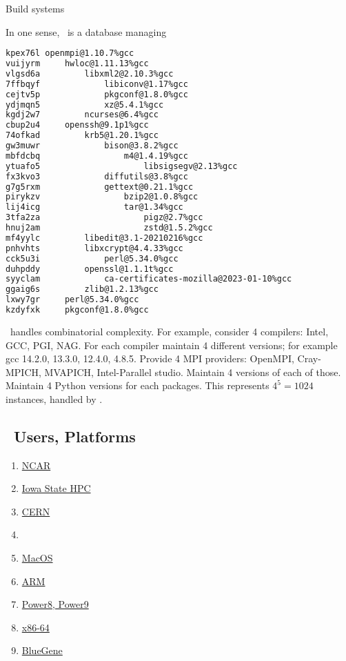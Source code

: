 \documentclass[10pt, oneside]{article}   	%
\begin{document}
Build systems

In one sense, \spack \ is a database managing 
\small{
\begin{lstlisting}[language=bash]
kpex76l openmpi@1.10.7%gcc
vuijyrm     hwloc@1.11.13%gcc
vlgsd6a         libxml2@2.10.3%gcc
7ffbqyf             libiconv@1.17%gcc
cejtv5p             pkgconf@1.8.0%gcc
ydjmqn5             xz@5.4.1%gcc
kgdj2w7         ncurses@6.4%gcc
cbup2u4     openssh@9.1p1%gcc
74ofkad         krb5@1.20.1%gcc
gw3muwr             bison@3.8.2%gcc
mbfdcbq                 m4@1.4.19%gcc
ytuafo5                     libsigsegv@2.13%gcc
fx3kvo3             diffutils@3.8%gcc
g7g5rxm             gettext@0.21.1%gcc
pirykzv                 bzip2@1.0.8%gcc
lij4icg                 tar@1.34%gcc
3tfa2za                     pigz@2.7%gcc
hnuj2am                     zstd@1.5.2%gcc
mf4yylc         libedit@3.1-20210216%gcc
pnhvhts         libxcrypt@4.4.33%gcc
cck5u3i             perl@5.34.0%gcc
duhpddy         openssl@1.1.1t%gcc
syyclam             ca-certificates-mozilla@2023-01-10%gcc
ggaig6s         zlib@1.2.13%gcc
lxwy7gr     perl@5.34.0%gcc
kzdyfxk     pkgconf@1.8.0%gcc
\end{lstlisting}
}

\spack \ handles combinatorial complexity. For example, consider 4 compilers: Intel, GCC, PGI, NAG. For each compiler maintain 4 different versions; for example gcc 14.2.0, 13.3.0, 12.4.0, 4.8.5. Provide 4 MPI providers: OpenMPI, Cray-MPICH, MVAPICH, Intel-Parallel studio. Maintain 4 versions of each of those. Maintain 4 Python versions for each packages. This represents $4^{5} = 1024$ instances, handled by \spack. 

\subsection{\spack \ Users, Platforms}

\begin{enumerate}
	\item \href{https://ncar-hpc-docs.readthedocs.io/en/latest/environment-and-software/user-environment/spack/spack/}{NCAR} 
	\item \href{https://www.hpc.iastate.edu/guides/using-spack-to-build-packages}{Iowa State HPC}
	\item \href{https://github.com/HSF/hep-spack}{CERN}
	\item {}
	\item \href{https://ipv6.rs/tutorial/macOS/Spack/}{MacOS}
	\item \href{https://en.wikipedia.org/wiki/ARM_architecture_family}{ARM}
	\item \href{https://en.wikipedia.org/wiki/POWER8}{Power8, Power9}
	\item \href{https://en.wikipedia.org/wiki/X86-64}{x86-64}
	\item \href{https://en.wikipedia.org/wiki/IBM_Blue_Gene}{BlueGene}
\end{enumerate}
\end{document}
